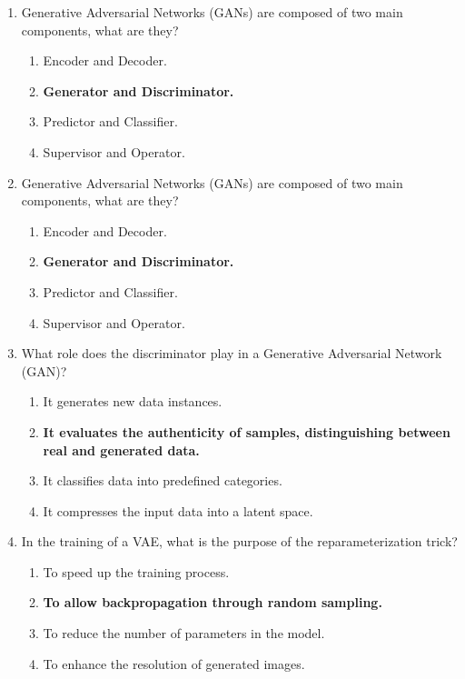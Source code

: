 \documentclass{report}
\numberwithin{equation}{section}
\begin{document}
\begin{enumerate}
\item Generative Adversarial Networks (GANs) are composed of two main components, what are they?
\begin{enumerate}[label=\alph*.]
    \item Encoder and Decoder.
    \item \textbf{Generator and Discriminator.}
    \item Predictor and Classifier.
    \item Supervisor and Operator.
\end{enumerate}
\item Generative Adversarial Networks (GANs) are composed of two main components, what are they?
\begin{enumerate}[label=\alph*.]
    \item Encoder and Decoder.
    \item \textbf{Generator and Discriminator.}
    \item Predictor and Classifier.
    \item Supervisor and Operator.
\end{enumerate}

\item What role does the discriminator play in a Generative Adversarial Network (GAN)?
\begin{enumerate}[label=\alph*.]
    \item It generates new data instances.
    \item \textbf{It evaluates the authenticity of samples, distinguishing between real and generated data.}
    \item It classifies data into predefined categories.
    \item It compresses the input data into a latent space.
\end{enumerate}

\item In the training of a VAE, what is the purpose of the reparameterization trick?
\begin{enumerate}[label=\alph*.]
    \item To speed up the training process.
    \item \textbf{To allow backpropagation through random sampling.}
    \item To reduce the number of parameters in the model.
    \item To enhance the resolution of generated images.
\end{enumerate}


\end{enumerate}
\end{document}
